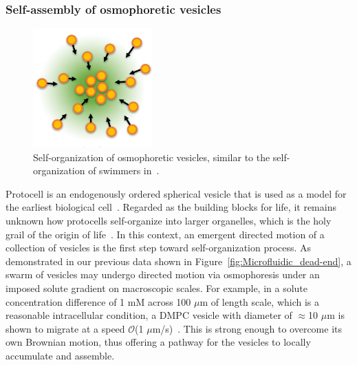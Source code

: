 \documentclass[11pt]{article}
\begin{document}
\subsubsection{Self-assembly of osmophoretic vesicles \label{subsubsec:self-assembly}}
\begin{figure}
\vspace*{-15pt}
\centerline{\includegraphics[width=1.8in]{figs/self-organization.pdf}}
\vspace*{-15pt}
\caption{\label{fig:self-organization} Self-organization of osmophoretic
  vesicles, similar to the self-organization of swimmers
  in~\cite{Nikolov2016_COCIS}.}
\end{figure}
%
Protocell is an endogenously ordered spherical vesicle that is used as a
model for the earliest biological cell~\cite{chen2010}.  Regarded as the
building blocks for life, it remains unknown how protocells
self-organize into larger organelles, which is the holy grail of the
origin of life~\cite{shklyaev2016}. In this context, an emergent
directed motion of a collection of vesicles is the first step toward
self-organization process.  As demonstrated in our previous data shown
in Figure~\ref{fig:Microfluidic_dead-end}, a swarm of vesicles may
undergo directed motion via osmophoresis under an imposed solute
gradient on macroscopic scales.  For example, in a solute concentration
difference of 1 mM across 100 $\mu$m of length scale, which is a
reasonable intracellular condition, a DMPC vesicle with diameter of
$\approx$10 $\mu$m is shown to migrate at a speed $\mathcal{O}$(1
$\mu$m/s)~\cite{nardi1999}. This is strong enough to overcome its own
Brownian motion, thus offering a pathway for the vesicles to locally
accumulate and assemble.
\end{document}
